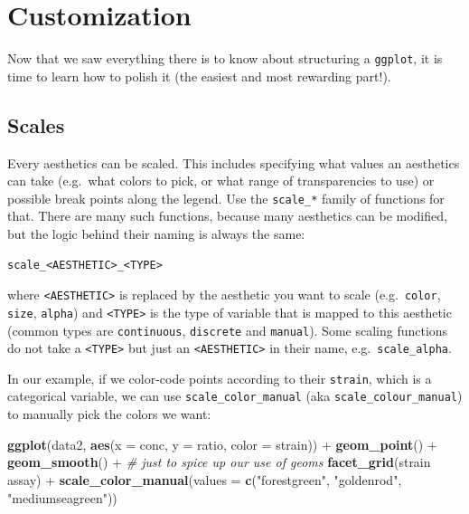 \documentclass[]{book}
\newenvironment{Shaded}{}{}
\newcommand{\CommentTok}[1]{\textcolor[rgb]{0.38,0.63,0.69}{\textit{#1}}}
\newcommand{\DataTypeTok}[1]{\textcolor[rgb]{0.56,0.13,0.00}{#1}}
\newcommand{\KeywordTok}[1]{\textcolor[rgb]{0.00,0.44,0.13}{\textbf{#1}}}
\newcommand{\NormalTok}[1]{#1}
\newcommand{\OperatorTok}[1]{\textcolor[rgb]{0.40,0.40,0.40}{#1}}
\newcommand{\StringTok}[1]{\textcolor[rgb]{0.25,0.44,0.63}{#1}}
\begin{document}
\hypertarget{customization}{%
\section{Customization}\label{customization}}

Now that we saw everything there is to know about structuring a \texttt{ggplot}, it is time to learn how to polish it (the easiest and most rewarding part!).

\hypertarget{scales}{%
\subsection{Scales}\label{scales}}

Every aesthetics can be scaled. This includes specifying what values an aesthetics can take (e.g.~what colors to pick, or what range of transparencies to use) or possible break points along the legend. Use the \texttt{scale\_*} family of functions for that. There are many such functions, because many aesthetics can be modified, but the logic behind their naming is always the same:

\begin{verbatim}
scale_<AESTHETIC>_<TYPE>
\end{verbatim}

where \texttt{\textless{}AESTHETIC\textgreater{}} is replaced by the aesthetic you want to scale (e.g.~\texttt{color}, \texttt{size}, \texttt{alpha}) and \texttt{\textless{}TYPE\textgreater{}} is the type of variable that is mapped to this aesthetic (common types are \texttt{continuous}, \texttt{discrete} and \texttt{manual}). Some scaling functions do not take a \texttt{\textless{}TYPE\textgreater{}} but just an \texttt{\textless{}AESTHETIC\textgreater{}} in their name, e.g.~\texttt{scale\_alpha}.

In our example, if we color-code points according to their \texttt{strain}, which is a categorical variable, we can use \texttt{scale\_color\_manual} (aka \texttt{scale\_colour\_manual}) to manually pick the colors we want:

\begin{Shaded}
\begin{Highlighting}[]
\KeywordTok{ggplot}\NormalTok{(data2, }\KeywordTok{aes}\NormalTok{(}\DataTypeTok{x =}\NormalTok{ conc, }\DataTypeTok{y =}\NormalTok{ ratio, }\DataTypeTok{color =}\NormalTok{ strain)) }\OperatorTok{+}
\StringTok{  }\KeywordTok{geom_point}\NormalTok{() }\OperatorTok{+}
\StringTok{  }\KeywordTok{geom_smooth}\NormalTok{() }\OperatorTok{+}\StringTok{ }\CommentTok{# just to spice up our use of geoms}
\StringTok{  }\KeywordTok{facet_grid}\NormalTok{(strain }\OperatorTok{~}\StringTok{ }\NormalTok{assay) }\OperatorTok{+}
\StringTok{  }\KeywordTok{scale_color_manual}\NormalTok{(}\DataTypeTok{values =} \KeywordTok{c}\NormalTok{(}\StringTok{"forestgreen"}\NormalTok{, }\StringTok{"goldenrod"}\NormalTok{, }\StringTok{"mediumseagreen"}\NormalTok{))}
\end{Highlighting}
\end{Shaded}
\end{document}

